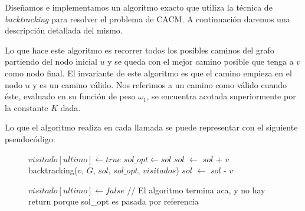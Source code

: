 Diseñamos e implementamos un algoritmo exacto que utiliza la técnica de \emph{backtracking} para resolver el problema de CACM. A continuación daremos una descripción detallada del mismo.

Lo que hace este algoritmo es recorrer todos los posibles caminos del grafo partiendo del nodo inicial $u$ y se queda con el mejor camino posible que tenga a $v$ como nodo final. El invariante de este algoritmo es que el camino empieza en el nodo $u$ y es un camino válido. Nos referimos a un camino como válido cuando éste, evaluado en su función de peso $\omega_1$, se encuentra acotada superiormente por la constante $K$ dada.

Lo que el algoritmo realiza en cada llamada se puede representar con el siguiente pseudocódigo:

\begin{center}
 \begin{figure}[H]
  \begin{pseudo}
    \State $visitado[ultimo] \leftarrow true$
	  \State $sol\_opt \leftarrow sol$
	\EndIf
      \Else 
	  \State $sol$ $\leftarrow$ $sol$ + $v$
	  \State backtracking($v$, $G$, $sol$, $sol\_opt$, $visitados$)
	  \State $sol$ $\leftarrow$ $sol$ - $v$
	\EndIf 
	
	\EndFor
      \EndIf
      \State $visitado[ultimo] \leftarrow false$
      \State // El algoritmo termina aca, y no hay return porque sol\_opt es pasada por referencia
   \EndProcedure
  \end{pseudo}
 \end{figure}
\end{center}